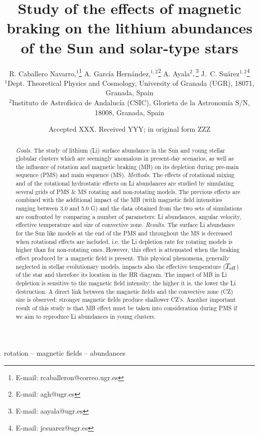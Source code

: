 \documentclass[fleqn,usenatbib]{mnras}
\title[Rotation, magnetic braking \& Li abundances]{Study of the effects of magnetic braking on the lithium abundances of the Sun and solar-type stars}
\author[R. Caballero Navarro et al.]{
R. Caballero Navarro,$^{1}$\thanks{E-mail: rcaballeron@correo.ugr.es}
A. Garc\'ia Hern\'andez,$^{1,2}$\thanks{E-mail: agh@ugr.es}
A. Ayala$^{2},$\thanks{E-mail: aayala@ugr.es}
J.~C. Su\'arez$^{1,2}$\thanks{E-mail: jcsuarez@ugr.es}
\\
$^{1}$Dept. Theoretical Physics and Cosmology, University of Granada (UGR), 18071, Granada, Spain\\
$^{2}$Instituto de Astrof\'isica de Andaluc\'ia (CSIC), Glorieta de la Astronom\'ia S/N, 18008, Granada, Spain\\
}
\date{Accepted XXX. Received YYY; in original form ZZZ}
\begin{document}
\label{firstpage}
\pagerange{\pageref{firstpage}--\pageref{lastpage}}
\maketitle

\begin{abstract}
\textit{Goals.} The study of lithium (Li) surface abundance in the Sun and young stellar globular clusters which are seemingly anomalous in present-day scenarios, as well as the influence of rotation and magnetic braking (MB) on its depletion during pre-main sequence (PMS) and main sequence (MS).
\newline\textit{Methods.} The effects of rotational mixing and of the rotational hydrostatic effects on Li abundances are studied by simulating several grids of PMS \& MS rotating and non-rotating models. The previous effects are combined with the additional impact of the MB (with magnetic field intensities ranging between 3.0 and 5.0 G) and the data obtained from the two sets of simulations are confronted by comparing a number of parameters: Li abundances, angular velocity, effective temperature and size of convective zone.
\newline\textit{Results.} The surface Li abundance for the Sun like models at the end of the PMS and throughout the MS is decreased when rotational effects are included, i.e. the Li depletion rate for rotating models is higher than for non-rotating ones. However, this effect is attenuated when the braking effect produced by a magnetic field is present. This physical phenomena, generally neglected in stellar evolutionary models, impacts also the effective temperature ($T_{\mathrm{eff}}$) of the star and therefore its location in the HR diagram. The impact of MB in Li depletion is sensitive to the magnetic field intensity: the higher it is, the lower the Li destruction. A direct link between the magnetic fields and the convective zone (CZ) size is observed: stronger magnetic fields produce shallower CZ's. Another important result of this study is that MB effect must be taken into consideration during PMS if we aim to reproduce Li abundances in young clusters.
\end{abstract}

\begin{keywords}
rotation -- magnetic fields -- abundances
\end{keywords}
\end{document}
